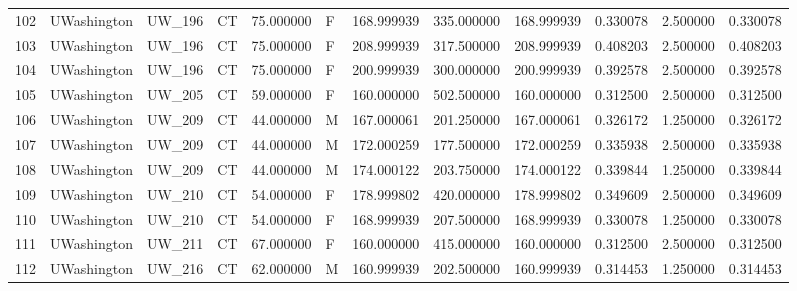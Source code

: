 \begin{tabular}{llllrlrrrrrr}
102    &     UWashington &       UW\_196 &                 CT &  75.000000 &        F &       168.999939 &    335.000000 &  168.999939 &               0.330078 &            2.500000 &          0.330078 \\
103    &     UWashington &       UW\_196 &                 CT &  75.000000 &        F &       208.999939 &    317.500000 &  208.999939 &               0.408203 &            2.500000 &          0.408203 \\
104    &     UWashington &       UW\_196 &                 CT &  75.000000 &        F &       200.999939 &    300.000000 &  200.999939 &               0.392578 &            2.500000 &          0.392578 \\
105    &     UWashington &       UW\_205 &                 CT &  59.000000 &        F &       160.000000 &    502.500000 &  160.000000 &               0.312500 &            2.500000 &          0.312500 \\
106    &     UWashington &       UW\_209 &                 CT &  44.000000 &        M &       167.000061 &    201.250000 &  167.000061 &               0.326172 &            1.250000 &          0.326172 \\
107    &     UWashington &       UW\_209 &                 CT &  44.000000 &        M &       172.000259 &    177.500000 &  172.000259 &               0.335938 &            2.500000 &          0.335938 \\
108    &     UWashington &       UW\_209 &                 CT &  44.000000 &        M &       174.000122 &    203.750000 &  174.000122 &               0.339844 &            1.250000 &          0.339844 \\
109    &     UWashington &       UW\_210 &                 CT &  54.000000 &        F &       178.999802 &    420.000000 &  178.999802 &               0.349609 &            2.500000 &          0.349609 \\
110    &     UWashington &       UW\_210 &                 CT &  54.000000 &        F &       168.999939 &    207.500000 &  168.999939 &               0.330078 &            1.250000 &          0.330078 \\
111    &     UWashington &       UW\_211 &                 CT &  67.000000 &        F &       160.000000 &    415.000000 &  160.000000 &               0.312500 &            2.500000 &          0.312500 \\
112    &     UWashington &       UW\_216 &                 CT &  62.000000 &        M &       160.999939 &    202.500000 &  160.999939 &               0.314453 &            1.250000 &          0.314453 \\

\end{tabular}
